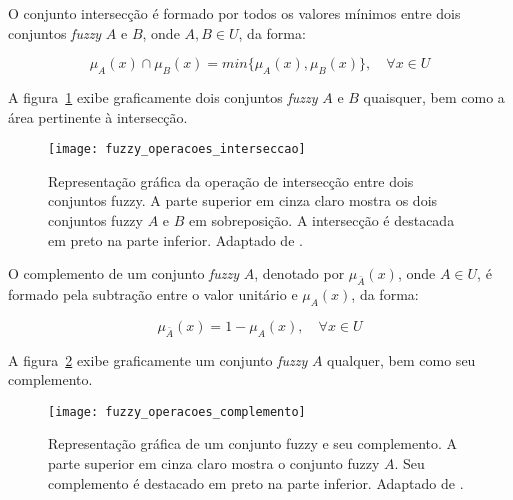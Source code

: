 \begin{defn}
\label{def:conjunto_fuzzy_interseccao}
O conjunto intersecção é formado por todos os valores mínimos entre dois conjuntos \emph{fuzzy} $A$ e $B$, onde $A, B \in U$, da forma:

\begin{equation}
  \mu_A(x) \cap \mu_B(x) = min\{\mu_A(x), \mu_B(x)\}, \quad \forall x \in U
\end{equation}
\end{defn}

A figura~\ref{fig:fuzzy_operacoes_interseccao} exibe graficamente dois conjuntos \emph{fuzzy} $A$ e $B$ quaisquer, bem como a área pertinente à intersecção.

\begin{figure}[!h]
  \centering
  \texttt{[image: fuzzy\_operacoes\_interseccao]}
  \caption[Operação de intersecção entre dois conjuntos fuzzy]{Representação gráfica da operação de intersecção entre dois conjuntos fuzzy. A parte superior em cinza claro mostra os dois conjuntos fuzzy $A$ e $B$ em sobreposição. A intersecção é destacada em preto na parte inferior. Adaptado de \citet{vrusias:06}.}
  \label{fig:fuzzy_operacoes_interseccao}
\end{figure}

\begin{defn}
\label{def:conjunto_fuzzy_complemento}
O complemento de um conjunto \emph{fuzzy} $A$, denotado por $\mu_{\bar{A}}(x)$, onde $A \in U$, é formado pela subtração entre o valor unitário e $\mu_A(x)$, da forma:

\begin{equation}
  \mu_{\bar{A}}(x) = 1 - \mu_A(x), \quad \forall x \in U
\end{equation}
\end{defn}

A figura~\ref{fig:fuzzy_operacoes_complemento} exibe graficamente um conjunto \emph{fuzzy} $A$ qualquer, bem como seu complemento.

\begin{figure}[!h]
  \centering
  \texttt{[image: fuzzy\_operacoes\_complemento]}
  \caption[Conjunto fuzzy e seu complemento]{Representação gráfica de um conjunto fuzzy e seu complemento. A parte superior em cinza claro mostra o conjunto fuzzy $A$. Seu complemento é destacado em preto na parte inferior. Adaptado de \citet{vrusias:06}.}
  \label{fig:fuzzy_operacoes_complemento}
\end{figure}

